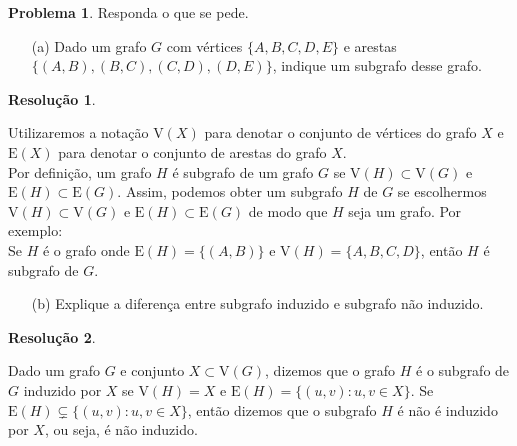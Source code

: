 \documentclass[12pt, a4paper]{article}
\theoremstyle{definition} \newtheorem{prob}{Problema}
\newtheorem*{res}{Resolução}
\begin{document}
\begin{prob} %
Responda o que se pede.
\begin{enumerate}
\item[(a)] Dado um grafo \(G\) com vértices \(\{A, B, C, D, E\}\) e arestas \(\{(A,B), (B,C), (C,D), (D,E)\}\), indique um subgrafo desse grafo.
\end{enumerate}
\dotfill
\begin{res}
\end{res}
Utilizaremos a notação \(\mathrm{V}(X)\) para denotar o conjunto de vértices do grafo \(X\) e \(\mathrm{E}(X)\) para denotar o conjunto de arestas do grafo \(X\). \\

Por definição, um grafo \(H\) é subgrafo de um grafo \(G\) se \(\mathrm{V}(H) \subset \mathrm{V}(G)\) e \(\mathrm{E}(H) \subset \mathrm{E}(G)\).  Assim, podemos obter um subgrafo \(H\) de \(G\) se escolhermos \(\mathrm{V}(H) \subset \mathrm{V}(G)\) e \(\mathrm{E}(H) \subset \mathrm{E}(G)\) de modo que \(H\) seja um grafo. Por exemplo: \\

Se \(H\) é o grafo onde \(\mathrm{E}(H) = \{(A,B)\}\) e \(\mathrm{V}(H) = \{A,B,C,D\}\), então \(H\) é subgrafo de \(G\).

\dotfill

\begin{itemize}
\item[(b)] 
Explique a diferença entre subgrafo induzido e subgrafo não induzido.
\end{itemize}
\dotfill
\begin{res}
\end{res}
Dado um grafo \(G\) e conjunto \(X \subset \mathrm{V}(G)\), dizemos que o grafo \(H\) é o subgrafo de \(G\) induzido por \(X\) se \(\mathrm{V}(H) = X \) e \(\mathrm{E}(H) = \{(u,v): u, v \in X\}\). Se \(\mathrm{E}(H) \varsubsetneq \{(u,v): u, v \in X\}\), então dizemos que o subgrafo \(H\) é não é induzido por \(X\), ou seja, é não induzido.

\end{prob}
\dotfill
\end{document}
